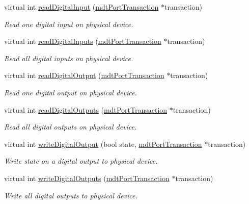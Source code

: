\begin{DoxyCompactItemize}
virtual int \hyperlink{classmdt_device_af128b606050035abaf8d049bb2227015}{readDigitalInput} (\hyperlink{classmdt_port_transaction}{mdtPortTransaction} $\ast$transaction)
\begin{DoxyCompactList}\small\item\em Read one digital input on physical device. \end{DoxyCompactList}\item 
virtual int \hyperlink{classmdt_device_a150e3abae6db5bf1ad11017bf2b76c14}{readDigitalInputs} (\hyperlink{classmdt_port_transaction}{mdtPortTransaction} $\ast$transaction)
\begin{DoxyCompactList}\small\item\em Read all digital inputs on physical device. \end{DoxyCompactList}\item 
virtual int \hyperlink{classmdt_device_a1faee6ab31b094731211ea0943544501}{readDigitalOutput} (\hyperlink{classmdt_port_transaction}{mdtPortTransaction} $\ast$transaction)
\begin{DoxyCompactList}\small\item\em Read one digital output on physical device. \end{DoxyCompactList}\item 
virtual int \hyperlink{classmdt_device_aac038c24c3b91757584bdf0d09fb8b02}{readDigitalOutputs} (\hyperlink{classmdt_port_transaction}{mdtPortTransaction} $\ast$transaction)
\begin{DoxyCompactList}\small\item\em Read all digital outputs on physical device. \end{DoxyCompactList}\item 
virtual int \hyperlink{classmdt_device_a0fbe57503d86554829e708b2b83d73f1}{writeDigitalOutput} (bool state, \hyperlink{classmdt_port_transaction}{mdtPortTransaction} $\ast$transaction)
\begin{DoxyCompactList}\small\item\em Write state on a digital output to physical device. \end{DoxyCompactList}\item 
virtual int \hyperlink{classmdt_device_aa9e8ae7b4ff2455b4105d280d8523fc1}{writeDigitalOutputs} (\hyperlink{classmdt_port_transaction}{mdtPortTransaction} $\ast$transaction)
\begin{DoxyCompactList}\small\item\em Write all digital outputs to physical device. \end{DoxyCompactList}\item 

\end{DoxyCompactItemize}

